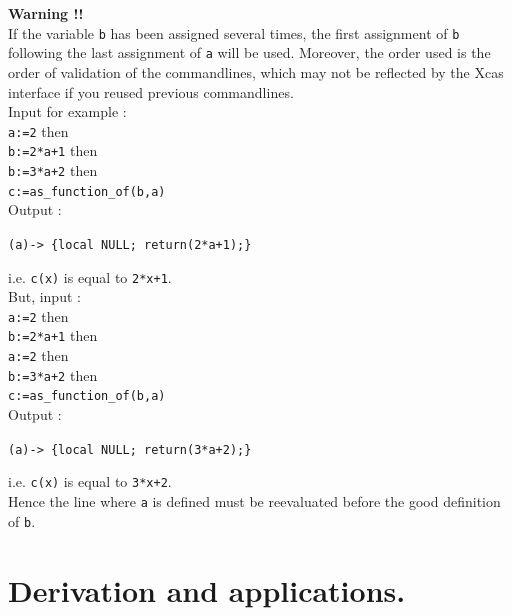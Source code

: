 \documentclass[a4paper,11pt]{book}
\begin{document}
{\bf Warning !!}\\
If the variable {\tt b} has been assigned
several times, the first assignment of {\tt b} following the last 
assignment of {\tt a} will be used. Moreover, the order used is the
order of validation of the commandlines, 
which may not be reflected by the Xcas interface
if you reused previous commandlines.\\
Input for example :\\
{\tt a:=2} then\\
{\tt b:=2*a+1} then\\
{\tt b:=3*a+2} then\\
{\tt  c:=as\_function\_of(b,a)}\\
Output :
\begin{center}{\tt (a)-> \{local NULL; return(2*a+1);\}}\end{center}
i.e. {\tt c(x)} is equal to {\tt 2*x+1}. \\
But, input :\\
{\tt a:=2} then\\
{\tt b:=2*a+1} then\\
{\tt a:=2} then\\
{\tt b:=3*a+2} then\\
{\tt  c:=as\_function\_of(b,a)}\\
Output :
\begin{center}{\tt (a)-> \{local NULL; return(3*a+2);\}}\end{center}
i.e. {\tt c(x)} is equal to {\tt 3*x+2}. \\
Hence the line where {\tt a} is defined must be reevaluated before the good
definition of {\tt b}.  

\section{Derivation and applications.}
\end{document}
